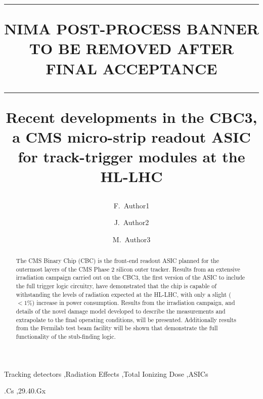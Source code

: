 \documentclass[5p,twocolumn,times,number]{elsarticle}
\def\pmbanner{{\hrule height 1 pt}\vskip35pt{NIMA POST-PROCESS BANNER TO BE REMOVED AFTER FINAL ACCEPTANCE}\vskip35pt{\hrule height 4pt}\vskip20pt}
\begin{document}
\begin{frontmatter}

\title{\pmbanner Recent developments in the CBC3, a CMS micro-strip readout ASIC for track-trigger modules at the HL-LHC}

\author[add1,add2]{F.~Author1}
\author[add3]{J.~Author2}
\author[add6]{M.~Author3}


\address[add1]{Institute 1, City, Country}
\address[add2]{Institute 2, City, Country}
\address[add3]{Institute 3, City, Country}
\address[add6]{Institute 6, City, Country}

\begin{abstract}
The CMS Binary Chip (CBC) is the front-end readout ASIC planned for the outermost layers of the CMS Phase 2 silicon outer tracker. Results from an extensive irradiation campaign carried out on the CBC3, the first version of the ASIC to include the full trigger logic circuitry, have demonstrated that the chip is capable of withstanding the levels of radiation expected at the HL-LHC, with only a slight (${<1\%}$) increase in power consumption. Results from the irradiation campaign, and details of the novel damage model developed to describe the measurements and extrapolate to the final operating conditions, will be presented. Additionally results from the Fermilab test beam facility will be shown that demonstrate the full functionality of the stub-finding logic.
% 
% 
\end{abstract}

\begin{keyword}
Tracking detectors \sep Radiation Effects \sep Total Ionizing Dose  \sep ASICs 

.Cs \sep 29.40.Gx    
\end{keyword}
\end{frontmatter}








\end{document}
